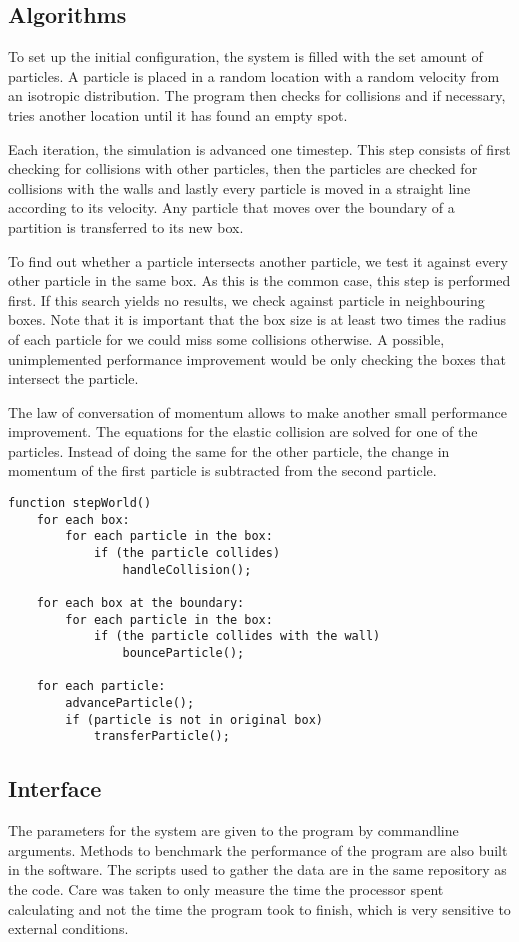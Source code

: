 \subsection{Algorithms}

To set up the initial configuration, the system is filled with the set amount 
of particles. A particle is placed in a random location with a random velocity 
from an isotropic distribution. The program then checks for collisions and if 
necessary, tries another location until it has found an empty spot.

Each iteration, the simulation is advanced one timestep. This step consists of 
first checking for collisions with other particles, then the particles are 
checked for collisions with the walls and lastly every particle is moved in a 
straight line according to its velocity. Any particle that moves over the 
boundary of a partition is transferred to its new box.

To find out whether a particle intersects another particle, we test it against 
every other particle in the same box. As this is the common case, this step is 
performed first. If this search yields no results, we check against particle in 
neighbouring boxes. Note that it is important that the box size is at least two 
times the radius of each particle for we could miss some collisions otherwise.  
A possible, unimplemented performance improvement would be only checking the 
boxes that intersect the particle. 

The law of conversation of momentum allows to make another small performance 
improvement. The equations for the elastic collision are solved for one of the 
particles. Instead of doing the same for the other particle, the change in 
momentum of the first particle is subtracted from the second particle.

\begin{lstlisting}
function stepWorld()
	for each box:
		for each particle in the box:
			if (the particle collides)
				handleCollision();
	
	for each box at the boundary:
		for each particle in the box:
			if (the particle collides with the wall)
				bounceParticle();
	
	for each particle:
		advanceParticle();
		if (particle is not in original box)
			transferParticle();
\end{lstlisting}

\subsection{Interface}
The parameters for the system are given to the program by commandline 
arguments. Methods to benchmark the performance of the program are also built 
in the software. The scripts used to gather the data are in the same repository 
as the code. Care was taken to only measure the time the processor spent 
calculating and not the time the program took to finish, which is very 
sensitive to external conditions.

